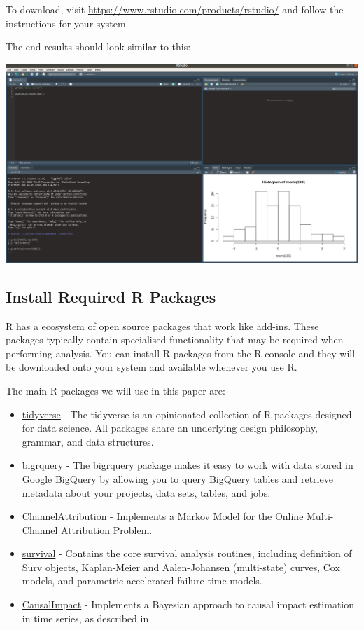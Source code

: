 \documentclass[]{book}
\begin{document}
To download, visit \url{https://www.rstudio.com/products/rstudio/} and follow
the instructions for your system.

The end results should look similar to this:

\includegraphics[width=6.01in]{img/rstudio}

\hypertarget{install-required-r-packages}{%
\subsection{Install Required R Packages}\label{install-required-r-packages}}

R has a ecosystem of open source packages that work like add-ins. These packages
typically contain specialised functionality that may be required when
performing analysis. You can install R packages from the R console and they will
be downloaded onto your system and available whenever you use R.

The main R packages we will use in this paper are:

\begin{itemize}
\item
  \href{https://www.tidyverse.org/}{tidyverse} - The tidyverse is an opinionated
  collection of R packages designed for data science. All packages share an
  underlying design philosophy, grammar, and data structures. \citep{R-tidyverse}
\item
  \href{https://bigrquery.r-dbi.org/}{bigrquery} - The bigrquery package makes it
  easy to work with data stored in Google BigQuery by allowing you to query
  BigQuery tables and retrieve metadata about your projects, data sets, tables, and
  jobs. \citep{R-bigrquery}
\item
  \href{https://cran.r-project.org/web/packages/ChannelAttribution}{ChannelAttribution} -
  Implements a Markov Model for the Online Multi-Channel Attribution Problem. \citep{R-ChannelAttribution}
\item
  \href{https://cran.r-project.org/web/packages/survival/}{survival} - Contains the
  core survival analysis routines, including definition of Surv objects,
  Kaplan-Meier and Aalen-Johansen (multi-state) curves, Cox models, and
  parametric accelerated failure time models. \citep{R-survival}
\item
  \href{https://cran.r-project.org/web/packages/CausalImpact/}{CausalImpact} - Implements
  a Bayesian approach to causal impact estimation in time series, as described
  in \citet{causalimpact}
\end{itemize}
\end{document}
